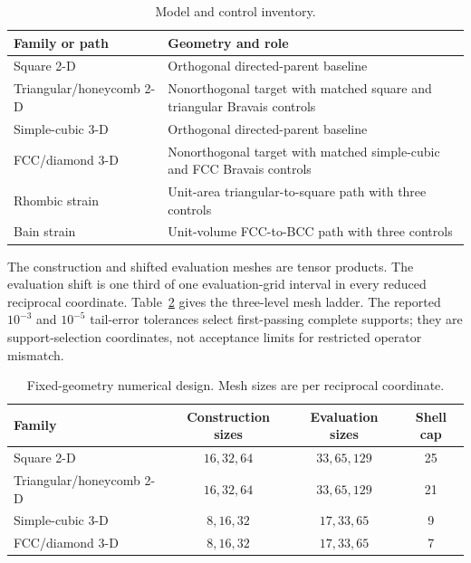 \begin{table}[htbp]
\centering
\small
\caption{Model and control inventory.}
\label{tab:app-protocol-inventory}
\begin{tabular}{@{}>{\raggedright\arraybackslash}p{}
                    >{\raggedright\arraybackslash}p{}@{}}
\toprule
Family or path & Geometry and role \\
\midrule
Square 2-D & Orthogonal directed-parent baseline \\
Triangular/honeycomb 2-D & Nonorthogonal target with matched square and triangular
Bravais controls \\
Simple-cubic 3-D & Orthogonal directed-parent baseline \\
FCC/diamond 3-D & Nonorthogonal target with matched simple-cubic and FCC Bravais
controls \\
Rhombic strain & Unit-area triangular-to-square path with three controls \\
Bain strain & Unit-volume FCC-to-BCC path with three controls \\
\bottomrule
\end{tabular}
\end{table}

The construction and shifted evaluation meshes are tensor products. The evaluation
shift is one third of one evaluation-grid interval in every reduced reciprocal
coordinate. Table~\ref{tab:app-numerical-design} gives the three-level mesh ladder. The
reported $10^{-3}$ and $10^{-5}$ tail-error tolerances select first-passing complete
supports; they are support-selection coordinates, not acceptance limits for restricted
operator mismatch.

\begin{table}[htbp]
\centering
\small
\caption{Fixed-geometry numerical design. Mesh sizes are per reciprocal coordinate.}
\label{tab:app-numerical-design}
\begin{tabular}{@{}lccc@{}}
\toprule
Family & Construction sizes & Evaluation sizes & Shell cap \\
\midrule
Square 2-D & $16,32,64$ & $33,65,129$ & 25 \\
Triangular/honeycomb 2-D & $16,32,64$ & $33,65,129$ & 21 \\
Simple-cubic 3-D & $8,16,32$ & $17,33,65$ & 9 \\
FCC/diamond 3-D & $8,16,32$ & $17,33,65$ & 7 \\
\bottomrule
\end{tabular}
\end{table}


